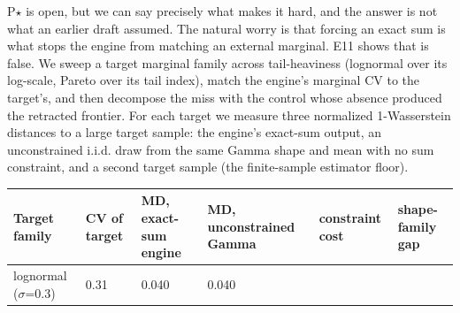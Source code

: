 P\ensuremath{\star} is open, but we can say precisely what makes it
hard, and the answer is not what an earlier draft assumed. The natural
worry is that forcing an exact sum is what stops the engine from
matching an external marginal. E11 shows that is false. We sweep a
target marginal family across tail-heaviness (lognormal over its
log-scale, Pareto over its tail index), match the engine's marginal CV
to the target's, and then decompose the miss with the control whose
absence produced the retracted frontier. For each target we measure
three normalized 1-Wasserstein distances to a large target sample: the
engine's exact-sum output, an unconstrained i.i.d. draw from the same
Gamma shape and mean with no sum constraint, and a second target sample
(the finite-sample estimator floor).

\begin{longtable}[]{@{}llllll@{}}
\toprule
\begin{minipage}[b]{0.14\columnwidth}\raggedright
Target family\strut
\end{minipage} & \begin{minipage}[b]{0.14\columnwidth}\raggedright
CV of target\strut
\end{minipage} & \begin{minipage}[b]{0.14\columnwidth}\raggedright
MD, exact-sum engine\strut
\end{minipage} & \begin{minipage}[b]{0.14\columnwidth}\raggedright
MD, unconstrained Gamma\strut
\end{minipage} & \begin{minipage}[b]{0.14\columnwidth}\raggedright
constraint cost\strut
\end{minipage} & \begin{minipage}[b]{0.14\columnwidth}\raggedright
shape-family gap\strut
\end{minipage}\tabularnewline
\midrule
\endhead
\begin{minipage}[t]{0.14\columnwidth}\raggedright
lognormal (\ensuremath{\sigma}=0.3)\strut
\end{minipage} & \begin{minipage}[t]{0.14\columnwidth}\raggedright
0.31\strut
\end{minipage} & \begin{minipage}[t]{0.14\columnwidth}\raggedright
0.040\strut
\end{minipage} & \begin{minipage}[t]{0.14\columnwidth}\raggedright
0.040\strut
\end{minipage} & \begin{minipage}[t]{0.14\columnwidth}\raggedright

\end{minipage}
\end{longtable}
